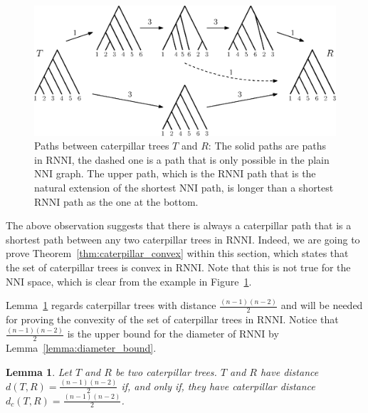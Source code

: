 \documentclass{amsart}
\newcommand{\nni}{\mathrm{NNI}}
\newcommand{\rnni}{\mathrm{RNNI}}
\newtheorem{lemma}[definition]{Lemma}
\begin{document}
\begin{figure}[H]
	\centering
	\includegraphics[width=\textwidth]{NNI_vs_RNNI}
    \vspace{2pt}
	\caption{Paths between caterpillar trees $T$ and $R$: The solid paths are paths in $\rnni$, the dashed one is a path that is only possible in the plain $\nni$ graph.
    The upper path, which is the $\rnni$ path that is the natural extension of the shortest $\nni$ path, is longer than a shortest $\rnni$ path as the one at the bottom.}
	\label{fig:NNI_vs_RNNI}
\end{figure}

The above observation suggests that there is always a caterpillar path that is a shortest path between any two caterpillar trees in $\rnni$.
Indeed, we are going to prove Theorem~\ref{thm:caterpillar_convex} within this section, which states that the set of caterpillar trees is convex in $\rnni$.
Note that this is not true for the $\nni$ space, which is clear from the example in Figure~\ref{fig:NNI_vs_RNNI}.

Lemma~\ref{lemma:caterpillar_dist=diameter} regards caterpillar trees with distance $\frac{(n-1)(n-2)}{2}$ and will be needed for proving the convexity of the set of caterpillar trees in $\rnni$.
Notice that $\frac{(n-1)(n-2)}{2}$ is the upper bound for the diameter of $\rnni$ by Lemma~\ref{lemma:diameter_bound}.

\begin{lemma}
    Let $T$ and $R$ be two caterpillar trees.
    $T$ and $R$ have distance $d(T,R) = \frac{(n-1)(n-2)}{2}$ if, and only if, they have caterpillar distance $d_c(T,R) = \frac{(n-1)(n-2)}{2}$.
    \label{lemma:caterpillar_dist=diameter}
\end{lemma}
\end{document}
